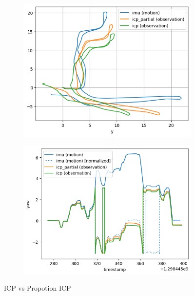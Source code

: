 \documentclass[conference]{IEEEtran}
\begin{document}
\begin{figure}
    \begin{subfigure}{0.45\textwidth}
        \includegraphics[width=\linewidth]{../img/propotion_ICP.png}
    \end{subfigure}
    \hfill
    \begin{subfigure}{0.45\textwidth}
        \includegraphics[width=\linewidth]{../img/propotion_ICP_yaw.png}
    \end{subfigure}
    
    \caption{ICP vs Propotion ICP}
    \label{fig:icp}
\end{figure}
\end{document}
